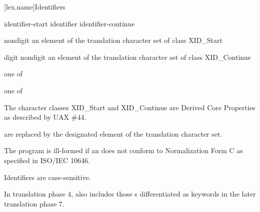 \documentclass{wg21}
\begin{document}
[lex.name]{Identifiers}

%
\begin{bnf}
    \br
    identifier-start\br
    identifier identifier-continue
\end{bnf}

\begin{bnf}
    \br
    nondigit\br
    \textnormal{an element of the translation character set of class XID_Start}
\end{bnf}

\begin{bnf}
    \br
    digit\br
    nondigit\br
    \textnormal{an element of the translation character set of class XID\_Continue}
\end{bnf}

\begin{bnf}
     \textnormal{one of}\br
    \br
    \br
    \br
\end{bnf}

\begin{bnf}
     \textnormal{one of}\br
\end{bnf}

\pnum
{}%
%
The character classes XID_Start and XID_Continue
are Derived Core Properties as described by UAX \#44.

\begin{addedblock}
 are replaced by the designated element of the translation character set.

\end{addedblock}

The program is ill-formed
if an  does not conform to
Normalization Form C as specified in ISO/IEC 10646.
\begin{note}
    Identifiers are case-sensitive.
\end{note}
\begin{note}
    In translation phase 4,
     also includes
    those s
    differentiated as keywords
    in the later translation phase 7.
\end{note}
\end{document}
